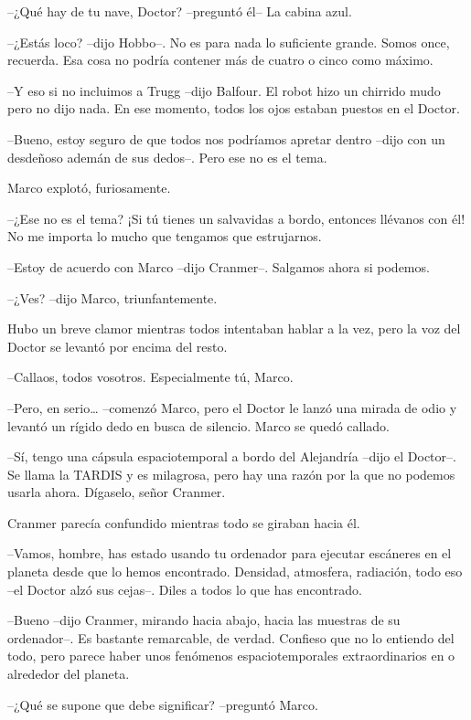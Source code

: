 {--¿Qué hay de tu nave, Doctor? --preguntó él-- La cabina azul.}

{--¿Estás loco? --dijo Hobbo--. No es para nada lo suficiente grande.
 Somos once, recuerda. Esa cosa no podría contener más de cuatro o cinco
como máximo.}

{--Y eso si no incluimos a Trugg --dijo Balfour. El robot hizo un
 chirrido mudo pero no dijo nada. En ese momento, todos los ojos estaban
puestos en el Doctor.}

{--Bueno, estoy seguro de que todos nos podríamos apretar dentro --dijo
con un desdeñoso ademán de sus dedos--. Pero ese no es el tema.}

{Marco explotó, furiosamente.}

{--¿Ese no es el tema? ¡Si tú tienes un salvavidas a bordo, entonces
llévanos con él! No me importa lo mucho que tengamos que estrujarnos.}

{--Estoy de acuerdo con Marco --dijo Cranmer--. Salgamos ahora si
podemos.}

{--¿Ves? --dijo Marco, triunfantemente.}

{Hubo un breve clamor mientras todos intentaban hablar a la vez, pero la
voz del Doctor se levantó por encima del resto.}

{--Callaos, todos vosotros. Especialmente tú, Marco.}

{--Pero, en serio\ldots{} --comenzó Marco, pero el Doctor le lanzó una
 mirada de odio y levantó un rígido dedo en busca de silencio. Marco se
quedó callado.}

{--Sí, tengo una cápsula espaciotemporal a bordo del Alejandría --dijo el
 Doctor--. Se llama la TARDIS y es milagrosa, pero hay una razón por la
que no podemos usarla ahora. Dígaselo, señor Cranmer.}

{Cranmer parecía confundido mientras todo se giraban hacia él.}

{--Vamos, hombre, has estado usando tu ordenador para ejecutar escáneres
 en el planeta desde que lo hemos encontrado. Densidad, atmosfera,
 radiación, todo eso --el Doctor alzó sus cejas--. Diles a todos lo que
has encontrado.}

{--Bueno --dijo Cranmer, mirando hacia abajo, hacia las muestras de su
 ordenador--. Es bastante remarcable, de verdad. Confieso que no lo
 entiendo del todo, pero parece haber unos fenómenos espaciotemporales
extraordinarios en o alrededor del planeta.}

{--¿Qué se supone que debe significar? --preguntó Marco.}

